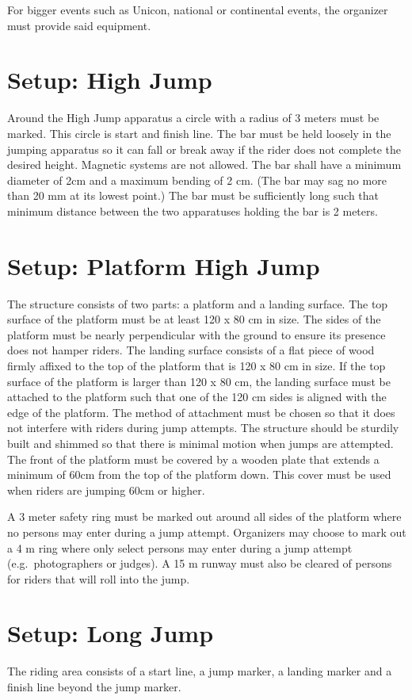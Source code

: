 For bigger events such as Unicon, national or continental events, the organizer must provide said equipment.

\section{Setup: High Jump}
Around the High Jump apparatus a circle with a radius of 3 meters must be marked.
This circle is start and finish line.
The bar must be held loosely in the jumping apparatus so it can fall or break away if the rider does not complete the desired height.
Magnetic systems are not allowed.
The bar shall have a minimum diameter of 2cm and a maximum bending of 2 cm.
(The bar may sag no more than 20 mm at its lowest point.)
The bar must be sufficiently long such that minimum distance between the two apparatuses holding the bar is 2 meters.

\section{Setup: Platform High Jump}
The structure consists of two parts: a platform and a landing surface.
The top surface of the platform must be at least 120 x 80 cm in size.
The sides of the platform must be nearly perpendicular with the ground to ensure its presence does not hamper riders.
The landing surface consists of a flat piece of wood firmly affixed to the top of the platform that is 120 x 80 cm in size.
If the top surface of the platform is larger than 120 x 80 cm, the landing surface must be attached to the platform such that one of the 120 cm sides is aligned with the edge of the platform.
The method of attachment must be chosen so that it does not interfere with riders during jump attempts.
The structure should be sturdily built and shimmed so that there is minimal motion when jumps are attempted.
The front of the platform must be covered by a wooden plate that extends a minimum of 60cm from the top of the platform down.
This cover must be used when riders are jumping 60cm or higher.

A 3 meter safety ring must be marked out around all sides of the platform where no persons may enter during a jump attempt.
Organizers may choose to mark out a 4 m ring where only select persons may enter during a jump attempt (e.g.\ photographers or judges).
A 15 m runway must also be cleared of persons for riders that will roll into the jump.

\section{Setup: Long Jump}
The riding area consists of a start line, a jump marker, a landing marker and a finish line beyond the jump marker.

